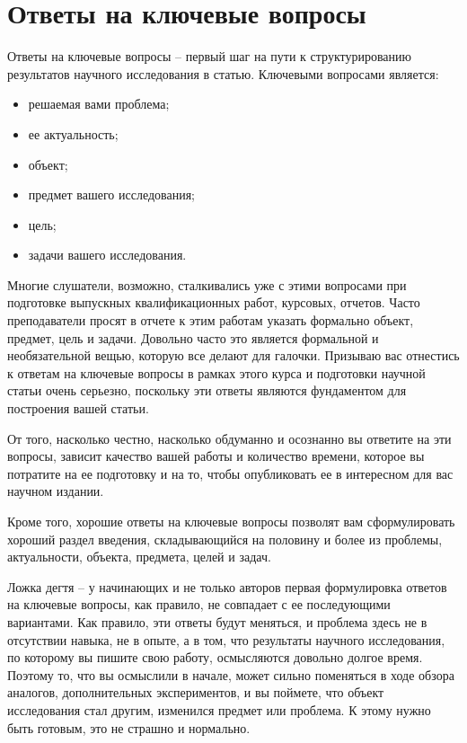 \documentclass{report}
\begin{document}
\section{Ответы на ключевые вопросы}

Ответы на ключевые вопросы – первый шаг на пути к структурированию результатов научного исследования в статью. Ключевыми вопросами является:

\begin{itemize}
	\item решаемая вами проблема;
	\item ее актуальность;
	\item объект;
	\item предмет вашего исследования;
	\item цель;
	\item задачи вашего исследования.
\end{itemize}

Многие слушатели, возможно, сталкивались уже с этими вопросами при подготовке выпускных квалификационных работ, курсовых, отчетов. Часто преподаватели просят в отчете к этим работам указать формально объект, предмет, цель и задачи. Довольно часто это является формальной и необязательной вещью, которую все делают для галочки. Призываю вас отнестись к ответам на ключевые вопросы в рамках этого курса и подготовки научной статьи очень серьезно, поскольку эти ответы являются фундаментом для построения вашей статьи.

От того, насколько честно, насколько обдуманно и осознанно вы ответите на эти вопросы, зависит качество вашей работы и количество времени, которое вы потратите на ее подготовку и на то, чтобы опубликовать ее в интересном для вас научном издании.

Кроме того, хорошие ответы на ключевые вопросы позволят вам сформулировать хороший раздел введения, складывающийся на половину и более из проблемы, актуальности, объекта, предмета, целей и задач.

Ложка дегтя – у начинающих и не только авторов первая формулировка ответов на ключевые вопросы, как правило, не совпадает с ее последующими вариантами. Как правило, эти ответы будут меняться, и проблема здесь не в отсутствии навыка, не в опыте, а в том, что результаты научного исследования, по которому вы пишите свою работу, осмысляются довольно долгое время. Поэтому то, что вы осмыслили в начале, может сильно поменяться в ходе обзора аналогов, дополнительных экспериментов, и вы поймете, что объект исследования стал другим, изменился предмет или проблема. К этому нужно быть готовым, это не страшно и нормально.
\end{document}

